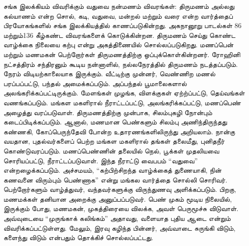 சங்க இலக்கியம் விவரிக்கும் வதுவை நன்மணம் விவரங்கள்: திருமணம் அல்லது கல்யாணம் என்ற சொல், கடி, வதுவை, மன்றல் மற்றும் வரை என்ற வார்த்தைப் பிரயோகங்களில் சங்க இலக்கியத்தில் காணப்படுகின்றது. அகநானூறு பாடல்கள் 86 மற்றும்136 கீழ்கண்ட விவரங்களைக் கொடுக்கின்றன. திருமணம் செய்து கொண்ட வாழ்க்கை நிலையை கற்பு என்று அகத்திணையில் சொல்லப்படுகிறது. மணப்பென் மற்றும் மணமகன் பெற்றோர்கள் திருமணத்திற்கு ஒப்புக்கொள்கின்றனர். ரோஹினி நட்சத்திரம் சந்திரனும் கூடிய நன்னாளில், நல்லநேரத்தில் திருமணம் நடத்தப்படும். நேரம் விடியற்காலையாக இருக்கும். வீட்டிற்கு முன்னர், வெண்ணிற மணல் பரப்பப்பட்டு, பந்தல் அமைக்கப்படும். அப்பந்தல் பூமாலைகளால் அலங்கரிக்கப்பட்டிருக்கும். மேளங்கள் முழங்க, விளக்குகள் ஏற்ற்ப்பட்டு, தெய்வங்கள் வணங்கப்படும். மங்கள மகளிரால் நீராட்டப்பட்டு, அலங்கரிக்கப்பட்டு, மணப்பெண் அழைத்து வரப்படுவாள். திருமணத்திற்கு முன்பாக, சிலம்புகழி நோன்பும் கடைப்பிடிக்கப்படும். ஆனால், மணமான பெண்களும் சிலம்பு அணிந்திருந்தது கண்ணகி, கோப்பெருந்தேவி போன்ற உதாரணங்களிலிருந்து அறியலாம். நான்கு வயதான, புதல்வர்களைப் பெற்ற மங்கள மகளிரால் தங்கள் தலைமீது, புனிதநீர் கொண்டுவரப்படும். மணப்பெண்ணின் தலையில் நெல், பூக்கள் முதலியவை சொரியப்பட்டு, நீராட்டப்படுவாள். இந்த நீராட்டு வைபபம் “வதுவை” என்றழைக்கப்படும். அச்சமயம், “கற்பிற்சிறந்த வாழ்க்கைத் துணையாகி, நின் கணவனை விரும்பும் பெண்ணாக” என்று மங்கல வார்த்தை சொல்லி சொரிவர். பெற்றோர்களும் வாழ்த்துவர், வந்தவர்களுக்கு விருந்துணவு அளிக்கப்படும். பிறகு, மணமக்கள் தனியான அறைக்கு அனுப்பப்படுவர். பெண் முகம் மூடிய நிலையில், இருக்கும் போது, மணமகன், முகத்திரையை விலக்க, அவள் பெருமூச்சு விடுவாள். அவ்வுடையை “முருங்காக் கலிங்கம்” அதாவது, வளையாத புதிய ஆடை என்றும் விவரிக்கப்பட்டுள்ளது. மேலும், இரவு கழிந்த பின்னர், அவ்வாடை சுருங்கி விடும், களைந்து விடும் என்பதும் தொக்கிச் சொல்லப்பட்டது.

